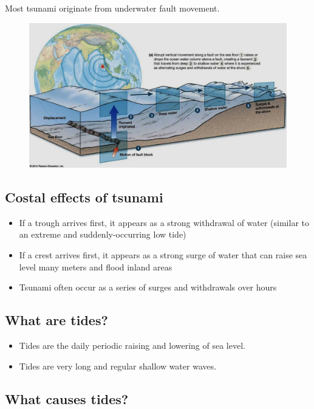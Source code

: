 Most tsunami originate from underwater fault movement.

\begin{figure}
    \centering
    \includegraphics[width=0.75\linewidth]{img/tsunami.png}
\end{figure}

\subsection{Costal effects of tsunami}

\begin{itemize}
    \item If a trough arrives first, it appears as a strong
        withdrawal of water (similar to an extreme and suddenly-occurring
        low tide)
    \item If a crest arrives first, it appears as a strong surge of water
        that can raise sea level many meters and flood inland areas
    \item Tsunami often occur as a series of surges and withdrawals over hours
\end{itemize}

\subsection{What are tides?}

\begin{itemize}
    \item Tides are the daily periodic raising and lowering of sea level.
    \item Tides are very long and regular shallow water waves.
\end{itemize}

\subsection{What causes tides?}

